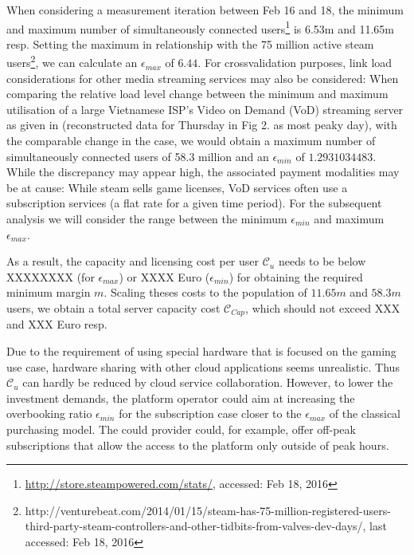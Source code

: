 
When considering a measurement iteration between Feb 16 and 18, the minimum and maximum number of simultaneously connected users\footnote{\url{http://store.steampowered.com/stats/}, accessed: Feb 18, 2016} is 6.53m and 11.65m	 resp. Setting the maximum in relationship with the 75 million active steam users\footnote{http://venturebeat.com/2014/01/15/steam-has-75-million-registered-users-third-party-steam-controllers-and-other-tidbits-from-valves-dev-days/, last accessed: Feb 18, 2016}, we can calculate an $\epsilon_{max}$ of $6.44$. For crossvalidation purposes, link load considerations for other media streaming services may also be considered: When comparing the relative load level change between the minimum and maximum utilisation of a large Vietnamese ISP's Video on Demand (VoD) streaming server as given in \cite{thanh2012enabling} (reconstructed data for Thursday in Fig 2. as most peaky day), with the comparable change in the case, we would obtain a maximum number of simultaneously connected users of 58.3 million and an $\epsilon_{min}$ of $1.2931034483$. While the discrepancy may appear high, the associated payment modalities may be at cause: While steam sells game licenses, VoD services often use a subscription services (a flat rate for a given time period). For the subsequent analysis we will consider the range between the minimum $\epsilon_{min}$ and maximum $\epsilon_{max}$.

As a result, the capacity and licensing cost per user $\mathcal{C}_u$ needs to be below XXXXXXXX (for $\epsilon_{max}$)  or XXXX Euro ($\epsilon_{min}$) for obtaining the required minimum margin $m$. Scaling theses costs to the population of $11.65m$ and  $58.3m$ users, we obtain a total server capacity cost $\mathcal{C}_{Cap}$, which should not exceed XXX and XXX Euro resp. 





Due to the requirement of using special hardware that is focused on the gaming use case, hardware sharing with other cloud applications seems unrealistic. Thus $\mathcal{C}_u$ can hardly be reduced by cloud service collaboration. However, to lower the investment demands, the platform operator could aim at increasing the overbooking ratio $\epsilon_{min}$ for the subscription case closer to the $\epsilon_{max}$ of the classical purchasing model. The could provider could, for example, offer off-peak subscriptions that allow the access to the platform only outside of peak hours.

